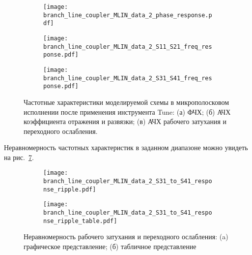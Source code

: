 \begin{figure}[!ht]
    \centering
    \begin{subfigure}[b]{0.3\textwidth}
        \centering
        \texttt{[image: branch\_line\_coupler\_MLIN\_data\_2\_phase\_response.pdf]}
        \caption{}%
    \label{fig:branch_line_coupler_MLIN_data_2_phase_response}
    \end{subfigure}
    \hfill
    \begin{subfigure}[b]{0.3\textwidth}
        \centering
        \texttt{[image: branch\_line\_coupler\_MLIN\_data\_2\_S11\_S21\_freq\_response.pdf]}
        \caption{}%
    \label{fig:branch_line_coupler_MLIN_data_2_S11_S21_freq_response}
    \end{subfigure}
    \hfill
    \begin{subfigure}[b]{0.3\textwidth}
        \centering
        \texttt{[image: branch\_line\_coupler\_MLIN\_data\_2\_S31\_S41\_freq\_response.pdf]}
        \caption{}%
    \label{fig:branch_line_coupler_MLIN_data_2_S31_S41_freq_response}
    \end{subfigure}
    \caption{%
        Частотные характеристики моделируемой схемы в микрополосковом исполнении после применения инструмента Tune:
        (а) ФЧХ;
        (б) АЧХ коэффициента отражения и развязки;
        (в) АЧХ рабочего затухания и переходного ослабления.
    }%
    \label{fig:branch_line_coupler_MLIN_data_2}
\end{figure}

Неравномерность частотных характеристик в заданном диапазоне можно увидеть на рис.~\ref{fig:branch_line_coupler_MLIN_data_2_response_ripple}.

\begin{figure}[!ht]
    \centering
    \begin{subfigure}[b]{0.6\textwidth}
        \centering
        \texttt{[image: branch\_line\_coupler\_MLIN\_data\_2\_S31\_to\_S41\_response\_ripple.pdf]}
        \caption{}%
    \label{fig:branch_line_coupler_MLIN_data_2_S31_to_S41_response_ripple}
    \end{subfigure}
    \vfill
    \begin{subfigure}[b]{0.6\textwidth}
        \centering
        \texttt{[image: branch\_line\_coupler\_MLIN\_data\_2\_S31\_to\_S41\_response\_ripple\_table.pdf]}
        \caption{}%
    \label{fig:branch_line_coupler_MLIN_data_2_S31_to_S41_response_ripple_table}
    \end{subfigure}
    \caption{%
        Неравномерность рабочего затухания и переходного ослабления:
        (a) графическое представление;
        (б) табличное представление
    }%
    \label{fig:branch_line_coupler_MLIN_data_2_response_ripple}
\end{figure}

